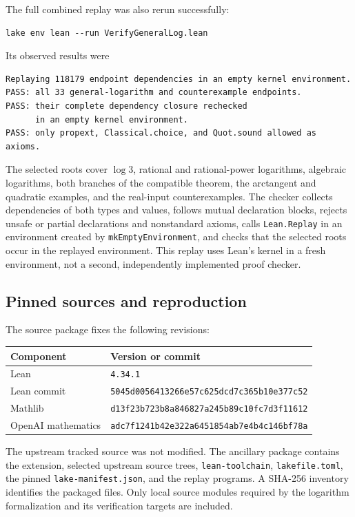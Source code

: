 The full combined replay was also rerun successfully:
\begin{Verbatim}[fontsize=\small]
lake env lean --run VerifyGeneralLog.lean
\end{Verbatim}
Its observed results were
\begin{Verbatim}[fontsize=\small]
Replaying 118179 endpoint dependencies in an empty kernel environment.
PASS: all 33 general-logarithm and counterexample endpoints.
PASS: their complete dependency closure rechecked
      in an empty kernel environment.
PASS: only propext, Classical.choice, and Quot.sound allowed as axioms.
\end{Verbatim}
The selected roots cover \(\log3\), rational and rational-power
logarithms, algebraic logarithms, both branches of the compatible
theorem, the arctangent and quadratic examples, and the real-input
counterexamples.
The checker collects dependencies of both types and values, follows
mutual declaration blocks, rejects unsafe or partial declarations
and nonstandard axioms, calls \texttt{Lean.Replay} in an environment
created by \texttt{mkEmptyEnvironment}, and checks that the selected
roots occur in the replayed environment.
This replay uses Lean's kernel in a fresh environment, not a second,
independently implemented proof checker.

\subsection{Pinned sources and reproduction}

The source package fixes the following revisions:
\begin{center}
\small
\begin{tabular}{@{}ll@{}}
\toprule
Component & Version or commit\\
\midrule
Lean & \texttt{4.34.1}\\
Lean commit & \texttt{5045d0056413266e57c625dcd7c365b10e377c52}\\
Mathlib & \texttt{d13f23b723b8a846827a245b89c10fc7d3f11612}\\
OpenAI mathematics & \texttt{adc7f1241b42e322a6451854ab7e4b4c146bf78a}\\
\bottomrule
\end{tabular}
\end{center}
The upstream tracked source was not modified.
The ancillary package contains the extension, selected upstream
source trees, \texttt{lean-toolchain}, \texttt{lakefile.toml},
the pinned \texttt{lake-manifest.json}, and the replay programs.
A SHA-256 inventory identifies the packaged files.
Only local source modules required by the logarithm formalization and
its verification targets are included.

